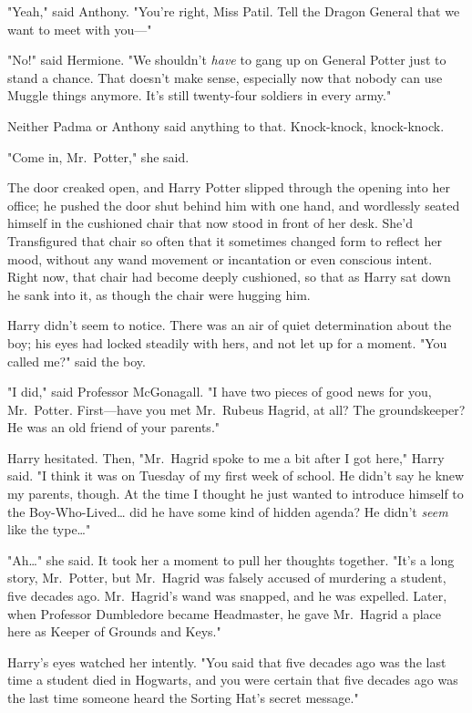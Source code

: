 "Yeah," said Anthony. "You're right, Miss Patil. Tell the Dragon General that
we want to meet with you---"

"No!" said Hermione. "We shouldn't \emph{have} to gang up on General Potter
just to stand a chance. That doesn't make sense, especially now that nobody can
use Muggle things anymore. It's still twenty-four soldiers in every army."

Neither Padma or Anthony said anything to that.
\later
Knock-knock, knock-knock.

"Come in, Mr.~Potter," she said.

The door creaked open, and Harry Potter slipped through the opening into her
office; he pushed the door shut behind him with one hand, and wordlessly seated
himself in the cushioned chair that now stood in front of her desk. She'd
Transfigured that chair so often that it sometimes changed form to reflect her
mood, without any wand movement or incantation or even conscious intent. Right
now, that chair had become deeply cushioned, so that as Harry sat down he sank
into it, as though the chair were hugging him.

Harry didn't seem to notice. There was an air of quiet determination about the
boy; his eyes had locked steadily with hers, and not let up for a moment. "You
called me?" said the boy.

"I did," said Professor McGonagall. "I have two pieces of good news for you,
Mr.~Potter. First---have you met Mr.~Rubeus Hagrid, at all? The groundskeeper?
He was an old friend of your parents."

Harry hesitated. Then, "Mr.~Hagrid spoke to me a bit after I got here," Harry
said. "I think it was on Tuesday of my first week of school. He didn't say he
knew my parents, though. At the time I thought he just wanted to introduce
himself to the Boy-Who-Lived{\ldots} did he have some kind of hidden agenda? He
didn't \emph{seem} like the type{\ldots}"

"Ah{\ldots}" she said. It took her a moment to pull her thoughts together.
"It's a long story, Mr.~Potter, but Mr.~Hagrid was falsely accused of murdering
a student, five decades ago. Mr.~Hagrid's wand was snapped, and he was
expelled. Later, when Professor Dumbledore became Headmaster, he gave
Mr.~Hagrid a place here as Keeper of Grounds and Keys."

Harry's eyes watched her intently. "You said that five decades ago was the last
time a student died in Hogwarts, and you were certain that five decades ago was
the last time someone heard the Sorting Hat's secret message."

